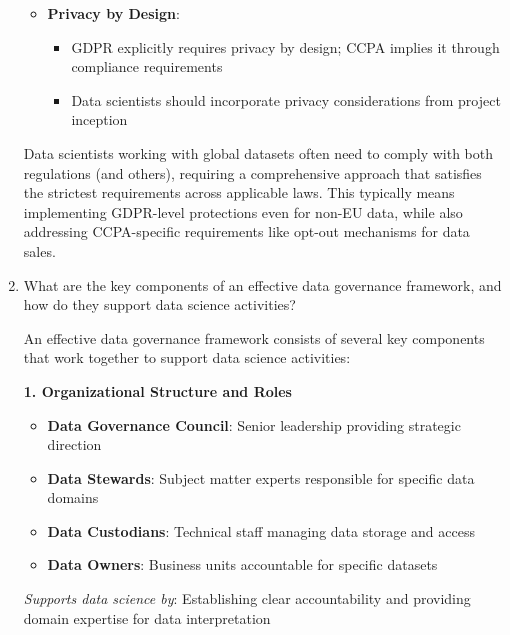 \documentclass[12pt]{article}
\begin{document}
\begin{enumerate}
\begin{tcolorbox}[colback=blue!5!white,colframe=blue!75!black,title={Solution}]
\begin{itemize}
        \item \textbf{Privacy by Design}:
          \begin{itemize}
              \item GDPR explicitly requires privacy by design; CCPA implies it through compliance requirements
              \item Data scientists should incorporate privacy considerations from project inception
          \end{itemize}
    \end{itemize}
    
    Data scientists working with global datasets often need to comply with both regulations (and others), requiring a comprehensive approach that satisfies the strictest requirements across applicable laws. This typically means implementing GDPR-level protections even for non-EU data, while also addressing CCPA-specific requirements like opt-out mechanisms for data sales.
    \end{tcolorbox}
    
    \item What are the key components of an effective data governance framework, and how do they support data science activities?
    
    \begin{tcolorbox}[colback=blue!5!white,colframe=blue!75!black,title={Solution}]
    An effective data governance framework consists of several key components that work together to support data science activities:
    
    \textbf{1. Organizational Structure and Roles}
    \begin{itemize}
        \item \textbf{Data Governance Council}: Senior leadership providing strategic direction
        \item \textbf{Data Stewards}: Subject matter experts responsible for specific data domains
        \item \textbf{Data Custodians}: Technical staff managing data storage and access
        \item \textbf{Data Owners}: Business units accountable for specific datasets
    \end{itemize}
    \textit{Supports data science by}: Establishing clear accountability and providing domain expertise for data interpretation
    

\end{tcolorbox}
\end{enumerate}
\end{document}
